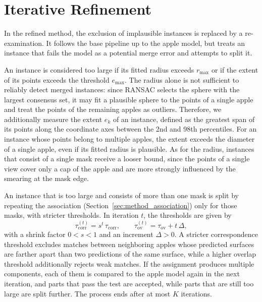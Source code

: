 \documentclass[english, egger, bsc]{vcethesis}
\begin{document}
\section{Iterative Refinement}
\label{sec:method_iterative}
In the refined method, the exclusion of implausible instances is replaced by a re-examination. It follows the base pipeline up to the apple model, but treats an instance that fails the model as a potential merge error and attempts to split it.

An instance is considered too large if its fitted radius exceeds $r_{\max}$ or if the extent of its points exceeds the threshold $e_{\max}$. The radius alone is not sufficient to reliably detect merged instances: since RANSAC selects the sphere with the largest consensus set, it may fit a plausible sphere to the points of a single apple and treat the points of the remaining apples as outliers. Therefore, we additionally measure the extent $e_k$ of an instance, defined as the greatest span of its points along the coordinate axes between the 2nd and 98th percentiles. For an instance whose points belong to multiple apples, the extent exceeds the diameter of a single apple, even if its fitted radius is plausible. As for the radius, instances that consist of a single mask receive a looser bound, since the points of a single view cover only a cap of the apple and are more strongly influenced by the smearing at the mask edge.

An instance that is too large and consists of more than one mask is split by repeating the association (Section~\ref{sec:method_association}) only for those masks, with stricter thresholds. In iteration $t$, the thresholds are given by 
\begin{equation}
    \label{eq:refine_thresholds}
    \tau_{\mathrm{corr}}^{(t)} = s^{t}\, \tau_{\mathrm{corr}},
    \qquad
    \tau_{\mathrm{ov}}^{(t)} = \tau_{\mathrm{ov}} + t\,\Delta,
\end{equation}
with a shrink factor $0 < s < 1$ and an increment $\Delta > 0$. A stricter correspondence threshold excludes matches between neighboring apples whose predicted surfaces are farther apart than two predictions of the same surface, while a higher overlap threshold additionally rejects weak matches. If the assignment produces multiple components, each of them is compared to the apple model again in the next iteration, and parts that pass the test are accepted, while parts that are still too large are split further. The process ends after at most $K$ iterations.
\end{document}
